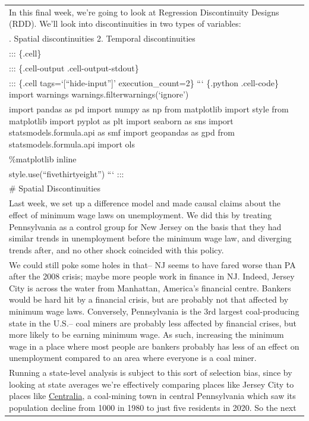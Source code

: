\documentclass[
  letterpaper,
  DIV=11,
  numbers=noendperiod]{scrreprt}
\begin{document}
\begin{longtable}[]{@{}
  >{\raggedright\arraybackslash}p{}@{}}
In this final week, we're going to look at Regression Discontinuity
Designs (RDD). We'll look into discontinuities in two types of
variables: \\
1. Spatial discontinuities 2. Temporal discontinuities \\
::: \{.cell\} \\
::: \{.cell-output .cell-output-stdout\} \\
::: \{.cell tags=`{[}``hide-input''{]}' execution\_count=2\} ```
\{.python .cell-code\} import warnings
warnings.filterwarnings(`ignore') \\
import pandas as pd import numpy as np from matplotlib import style from
matplotlib import pyplot as plt import seaborn as sns import
statsmodels.formula.api as smf import geopandas as gpd from
statsmodels.formula.api import ols \\
\%matplotlib inline \\
style.use(``fivethirtyeight'') ``` ::: \\
\# Spatial Discontinuities \\
Last week, we set up a difference model and made causal claims about the
effect of minimum wage laws on unemployment. We did this by treating
Pennsylvania as a control group for New Jersey on the basis that they
had similar trends in unemployment before the minimum wage law, and
diverging trends after, and no other shock coincided with this
policy. \\
We could still poke some holes in that-- NJ seems to have fared worse
than PA after the 2008 crisis; maybe more people work in finance in NJ.
Indeed, Jersey City is across the water from Manhattan, America's
financial centre. Bankers would be hard hit by a financial crisis, but
are probably not that affected by minimum wage laws. Conversely,
Pennsylvania is the 3rd largest coal-producing state in the U.S.-- coal
miners are probably less affected by financial crises, but more likely
to be earning minimum wage. As such, increasing the minimum wage in a
place where most people are bankers probably has less of an effect on
unemployment compared to an area where everyone is a coal miner. \\
Running a state-level analysis is subject to this sort of selection
bias, since by looking at state averages we're effectively comparing
places like Jersey City to places like
\href{https://en.wikipedia.org/wiki/Centralia,_Pennsylvania}{Centralia},
a coal-mining town in central Pennsylvania which saw its population
decline from 1000 in 1980 to just five residents in 2020. So the next

\end{longtable}
\end{document}
